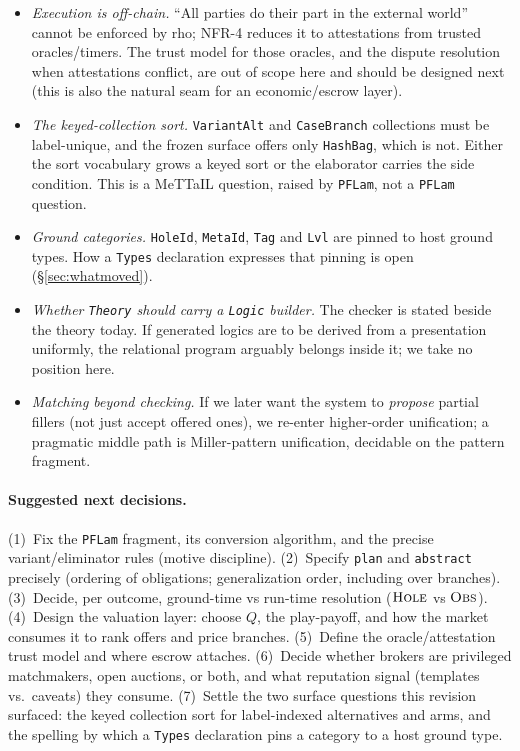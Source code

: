 \documentclass[11pt]{article}
\newcommand{\rul}[1]{\ensuremath{\textsc{#1}}}
\newcommand{\code}[1]{\lstinline[language=rho,basicstyle=\ttfamily\small]|#1|}
\begin{document}
\begin{itemize}[leftmargin=1.4em,itemsep=2pt]
  behaviourally here; its exact generalization order is open. (Branching makes this richer: a template
  may abstract over \emph{which branch} was taken, i.e.\ generalize a realized path back to the polynomial.)
  \item \emph{Execution is off-chain.} ``All parties do their part in the external world'' cannot be
  enforced by rho; NFR-4 reduces it to attestations from trusted oracles/timers. The trust model for
  those oracles, and the dispute resolution when attestations conflict, are out of scope here and
  should be designed next (this is also the natural seam for an economic/escrow layer).
  \item \emph{The keyed-collection sort.} \texttt{VariantAlt} and \texttt{CaseBranch} collections
  must be label-unique, and the frozen surface offers only \texttt{HashBag}, which is not. Either
  the sort vocabulary grows a keyed sort or the elaborator carries the side condition. This is a
  MeTTaIL question, raised by \texttt{PFLam}, not a \texttt{PFLam} question.
  \item \emph{Ground categories.} \texttt{HoleId}, \texttt{MetaId}, \texttt{Tag} and \texttt{Lvl}
  are pinned to host ground types. How a \texttt{Types} declaration expresses that pinning is open
  (\S\ref{sec:whatmoved}).
  \item \emph{Whether \texttt{Theory} should carry a \texttt{Logic} builder.} The checker is stated
  beside the theory today. If generated logics are to be derived from a presentation uniformly, the
  relational program arguably belongs inside it; we take no position here.
  \item \emph{Matching beyond checking.} If we later want the system to \emph{propose} partial fillers
  (not just accept offered ones), we re-enter higher-order unification; a pragmatic middle path is
  Miller-pattern unification, decidable on the pattern fragment.
\end{itemize}

\paragraph{Suggested next decisions.} (1)~Fix the \texttt{PFLam} fragment, its conversion algorithm,
and the precise variant/eliminator rules (motive discipline). (2)~Specify \code{plan} and
\code{abstract} precisely (ordering of obligations; generalization order, including over branches).
(3)~Decide, per outcome, ground-time vs run-time resolution (\rul{Hole} vs \rul{Obs}). (4)~Design the
valuation layer: choose $Q$, the play-payoff, and how the market consumes it to rank offers and price
branches. (5)~Define the oracle/attestation trust model and where escrow attaches. (6)~Decide whether
brokers are privileged matchmakers, open auctions, or both, and what reputation signal (templates
vs.\ caveats) they consume. (7)~Settle the two surface questions this revision surfaced: the keyed
collection sort for label-indexed alternatives and arms, and the spelling by which a \texttt{Types}
declaration pins a category to a host ground type.
\end{document}
